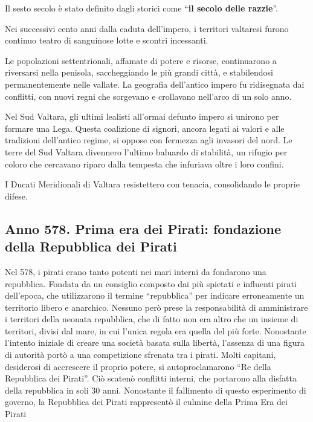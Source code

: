Il sesto secolo è stato definito dagli storici come ``\textbf{il secolo
delle razzie}''.

Nei successivi cento anni dalla caduta dell'impero, i territori
valtaresi furono continuo teatro di sanguinose lotte e scontri
incessanti.

Le popolazioni settentrionali, affamate di potere e risorse,
continuarono a riversarsi nella penisola, saccheggiando le più grandi
città, e stabilendosi permanentemente nelle vallate. La geografia
dell'antico impero fu ridisegnata dai conflitti, con nuovi regni che
sorgevano e crollavano nell'arco di un solo anno.

Nel Sud Valtara, gli ultimi lealisti all'ormai defunto impero si unirono
per formare una Lega. Questa coalizione di signori, ancora legati ai
valori e alle tradizioni dell'antico regime, si oppose con fermezza agli
invasori del nord. Le terre del Sud Valtara divennero l'ultimo baluardo
di stabilità, un rifugio per coloro che cercavano riparo dalla tempesta
che infuriava oltre i loro confini.

I Ducati Meridionali di Valtara resistettero con tenacia, consolidando
le proprie difese.

\subsection{\texorpdfstring{Anno 578. \textbf{Prima era dei Pirati:
fondazione della Repubblica dei
Pirati}}{Anno 578. Prima era dei Pirati: fondazione della Repubblica dei Pirati}}\label{anno-578.-prima-era-dei-pirati-fondazione-della-repubblica-dei-pirati}

Nel 578, i pirati erano tanto potenti nei mari interni da fondarono una
repubblica. Fondata da un consiglio composto dai più spietati e
influenti pirati dell'epoca, che utilizzarono il termine ``repubblica''
per indicare erroneamente un territorio libero e anarchico. Nessuno però
prese la responsabilità di amministrare i territori della neonata
repubblica, che di fatto non era altro che un insieme di territori,
divisi dal mare, in cui l'unica regola era quella del più forte.
Nonostante l'intento iniziale di creare una società basata sulla
libertà, l'assenza di una figura di autorità portò a una competizione
sfrenata tra i pirati. Molti capitani, desiderosi di accrescere il
proprio potere, si autoproclamarono ``Re della Repubblica dei Pirati''.
Ciò scatenò conflitti interni, che portarono alla disfatta della
repubblica in soli 30 anni. Nonostante il fallimento di questo
esperimento di governo, la Repubblica dei Pirati rappresentò il culmine
della Prima Era dei Pirati

